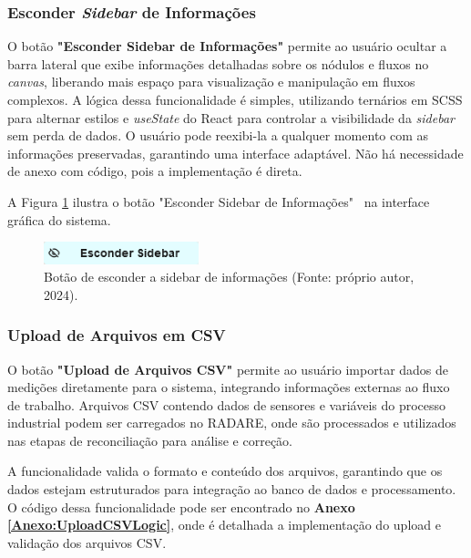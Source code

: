 \subsubsection{Esconder \textit{Sidebar} de Informações}

O botão \textbf{"Esconder Sidebar de Informações"} permite ao usuário ocultar a barra lateral que exibe informações detalhadas sobre os nódulos e fluxos no \textit{canvas}, liberando mais espaço para visualização e manipulação em fluxos complexos. A lógica dessa funcionalidade é simples, utilizando ternários em SCSS para alternar estilos e \textit{useState} do React para controlar a visibilidade da \textit{sidebar} sem perda de dados. O usuário pode reexibi-la a qualquer momento com as informações preservadas, garantindo uma interface adaptável. Não há necessidade de anexo com código, pois a implementação é direta.

A Figura \ref{Fig:HideSidebarButton} ilustra o botão "Esconder Sidebar de Informações" \ na interface gráfica do sistema.

\begin{figure}[htbp]
    \centering
    \includegraphics[width=0.4\textwidth]{figuras/hide-sidebar-button.png}
    \caption{Botão de esconder a sidebar de informações (Fonte: próprio autor, 2024).}
    \label{Fig:HideSidebarButton}
\end{figure}

\subsubsection{Upload de Arquivos em CSV}

O botão \textbf{"Upload de Arquivos CSV"} permite ao usuário importar dados de medições diretamente para o sistema, integrando informações externas ao fluxo de trabalho. Arquivos CSV contendo dados de sensores e variáveis do processo industrial podem ser carregados no RADARE, onde são processados e utilizados nas etapas de reconciliação para análise e correção.

A funcionalidade valida o formato e conteúdo dos arquivos, garantindo que os dados estejam estruturados para integração ao banco de dados e processamento. O código dessa funcionalidade pode ser encontrado no \textbf{Anexo \ref{Anexo:UploadCSVLogic}}, onde é detalhada a implementação do upload e validação dos arquivos CSV.

